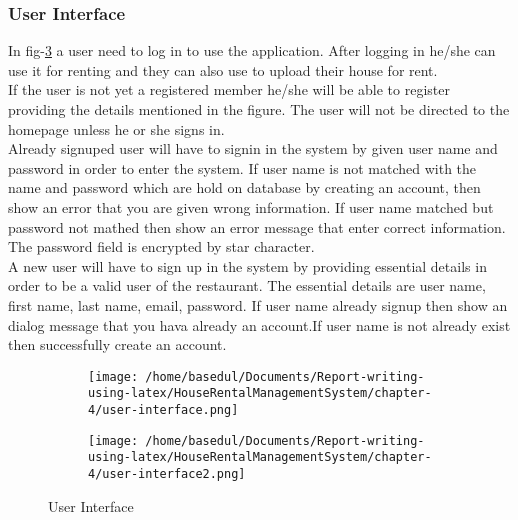 \documentclass[12pt,a4paper]{article}
\newcommand\tab[1][.7cm]{\hspace*{#1}}
\begin{document}
	\subsubsection{User Interface}
	\tab In fig-\ref{fig:user-info} a user need to log in to use the application. After logging in he/she can use it for renting and they can also
use to upload their house for rent.\\If the user is not yet a registered member he/she will be able to register providing the details mentioned in the figure. The user will not be directed to the homepage unless he or she signs in.\\Already signuped user will have to signin in the system by given user name and
password in order to enter the system. If user name is not matched with the name and
password which are hold on database by creating an account, then show an error that you
are given wrong information. If user name matched but password not mathed then show
an error message that enter correct information. The password field is encrypted by star
character.\\A new user will have to sign up in the system by providing essential details in order to
be a valid user of the restaurant. The essential details are user name, first name, last name,
email, password. If user name already signup then show an dialog message that you hava
already an account.If user name is not already exist then successfully create an account.
%
\begin{figure}[H]
 \centering
\begin{subfigure}{0.5\textwidth}
\texttt{[image: /home/basedul/Documents/Report-writing-using-latex/HouseRentalManagementSystem/chapter-4/user-interface.png]} 
\label{fig:user-int}
\end{subfigure}
\begin{subfigure}{0.5\textwidth}
\texttt{[image: /home/basedul/Documents/Report-writing-using-latex/HouseRentalManagementSystem/chapter-4/user-interface2.png]}
\label{fig:subim2}
\end{subfigure}
 
\caption{User Interface}
\label{fig:user-info}
\end{figure}
\end{document}
